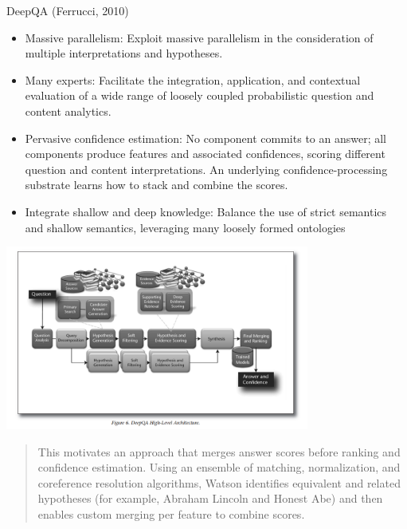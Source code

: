 \documentclass{beamer}
\begin{document}
\begin{frame}{DeepQA (Ferrucci, 2010)}
  \begin{itemize}
  \item 

  Massive parallelism: Exploit massive parallelism
  in the consideration of multiple interpretations
  and hypotheses.
  
  \item Many experts: Facilitate the integration, application,
    and contextual evaluation of a wide range of
    loosely coupled probabilistic question and content
    analytics.
  \item Pervasive confidence estimation: No component
    commits to an answer; all components produce
    features and associated confidences, scoring different
    question and content interpretations. An
    underlying confidence-processing substrate learns
    how to stack and combine the scores.
  \item 
    Integrate shallow and deep knowledge: Balance the
    use of strict semantics and shallow semantics,
    leveraging many loosely formed ontologies
  \end{itemize}
\end{frame}

\begin{frame}
  \begin{center}
    \includegraphics[width=10cm]{deepqa}
  \end{center}
\end{frame}

  

\begin{frame}
  \begin{quote}
    This motivates an approach that merges answer scores before
    ranking and confidence estimation.  Using an ensemble of matching,
    normalization, and coreference resolution algorithms, Watson
    identifies equivalent and related hypotheses (for example, Abraham
    Lincoln and Honest Abe) and then enables custom merging per
    feature to combine scores.
  \end{quote}
\end{frame}
\end{document}

